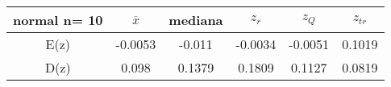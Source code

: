 \begin{tabular}{|c|c|c|c|c|c|}
\hline
normal n= 10& $\overline{x}$ & mediana & $z_r$ & $z_Q$ & $z_{tr}$ \\ \hline
E(z) & -0.0053 & -0.011 & -0.0034 & -0.0051 & 0.1019 \\ \hline
D(z) & 0.098 & 0.1379 & 0.1809 & 0.1127 & 0.0819 \\ \hline
\end{tabular}